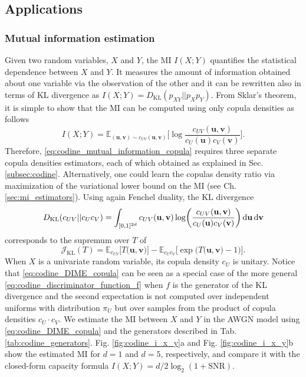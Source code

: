 \subsection{Applications}
\label{subsec:codine_applications}

\subsubsection{Mutual information estimation}
Given two random variables, $X$ and $Y$, the MI $I(X;Y)$ quantifies the statistical dependence between $X$ and $Y$. It measures the amount of information obtained about one variable via the observation of the other and it can be rewritten also in terms of KL divergence as
${I}(X;Y) = D_{\text{KL}}(p_{XY}||p_Xp_Y)$.
From Sklar's theorem, it is simple to show that the MI can be computed using only copula densities as follows
\begin{equation}
\label{eq:codine_mutual_information_copula}
{I}(X;Y) = \mathbb{E}_{(\mathbf{u},\mathbf{v})\sim c_{UV}(\mathbf{u},\mathbf{v})}\biggl[\log\frac{c_{UV}(\mathbf{u},\mathbf{v})}{c_U(\mathbf{u}) c_V(\mathbf{v})}\biggr].
\end{equation}
Therefore, \eqref{eq:codine_mutual_information_copula} requires three separate copula densities estimators, each of which obtained as explained in Sec. \ref{subsec:codine}. Alternatively, one could learn the copulas density ratio via maximization of the variational lower bound on the MI (see Ch. \ref{sec:mi_estimators}). Using again Fenchel duality, the KL divergence
\begin{equation}
D_{\text{KL}}(c_{UV}||c_Uc_V) = \int_{[0,1]^{2d}}{c_{UV}(\mathbf{u},\mathbf{v})\log\biggl(\frac{c_{UV}(\mathbf{u},\mathbf{v})}{c_U(\mathbf{u})c_V(\mathbf{v})}\biggr)\mathop{}\!\mathrm{d} \mathbf{u} \mathop{}\!\mathrm{d} \mathbf{v}}
\end{equation}
corresponds to the supremum over $T$ of
\begin{equation}
\label{eq:codine_DIME_copula}
\mathcal{J}_{\text{KL}}(T) = \mathbb{E}_{c_{UV}}\biggl[T\bigl(\mathbf{u},\mathbf{v}\bigr)\biggr] - \mathbb{E}_{c_{U}c_{V}}\biggl[\exp{\bigl(T \bigl(\mathbf{u},\mathbf{v }\bigr)-1 \bigr)}\biggr].
\end{equation}
When $X$ is a univariate random variable, its copula density $c_U$ is unitary. Notice that \eqref{eq:codine_DIME_copula} can be seen as a special case of the more general \eqref{eq:codine_discriminator_function_f} when $f$ is the generator of the KL divergence and the second expectation is not computed over independent uniforms with distribution $\pi_U$ but over samples from the product of copula densities $c_U\cdot c_V$. 
We estimate the MI between $X$ and $Y$ in the AWGN model using \eqref{eq:codine_DIME_copula} and the generators described in Tab. \ref{tab:codine_generators}. Fig. \ref{fig:codine_i_x_y}a and Fig. \ref{fig:codine_i_x_y}b show the estimated MI for $d=1$ and $d=5$, respectively, and compare it with the closed-form capacity formula $I(X;Y) = d/2\log_2(1+\text{SNR})$. 

